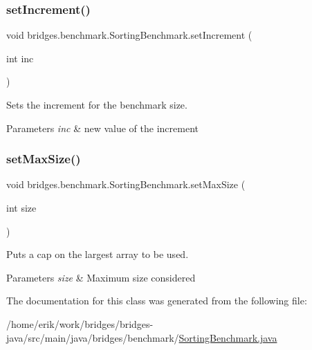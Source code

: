 \subsubsection{\texorpdfstring{set\+Increment()}{setIncrement()}}
{\footnotesize\ttfamily void bridges.\+benchmark.\+Sorting\+Benchmark.\+set\+Increment (\begin{DoxyParamCaption}\item[{int}]{inc }\end{DoxyParamCaption})}



Sets the increment for the benchmark size. 


\begin{DoxyParams}{Parameters}
{\em inc} & new value of the increment \\
\hline
\end{DoxyParams}
\mbox{\label{classbridges_1_1benchmark_1_1_sorting_benchmark_a62db485e1a96afce2eed758e6e65555c}} 
\subsubsection{\texorpdfstring{set\+Max\+Size()}{setMaxSize()}}
{\footnotesize\ttfamily void bridges.\+benchmark.\+Sorting\+Benchmark.\+set\+Max\+Size (\begin{DoxyParamCaption}\item[{int}]{size }\end{DoxyParamCaption})}



Puts a cap on the largest array to be used. 


\begin{DoxyParams}{Parameters}
{\em size} & Maximum size considered \\
\hline
\end{DoxyParams}


The documentation for this class was generated from the following file\+:\begin{DoxyCompactItemize}
\item 
/home/erik/work/bridges/bridges-\/java/src/main/java/bridges/benchmark/\hyperlink{_sorting_benchmark_8java}{Sorting\+Benchmark.\+java}\end{DoxyCompactItemize}
